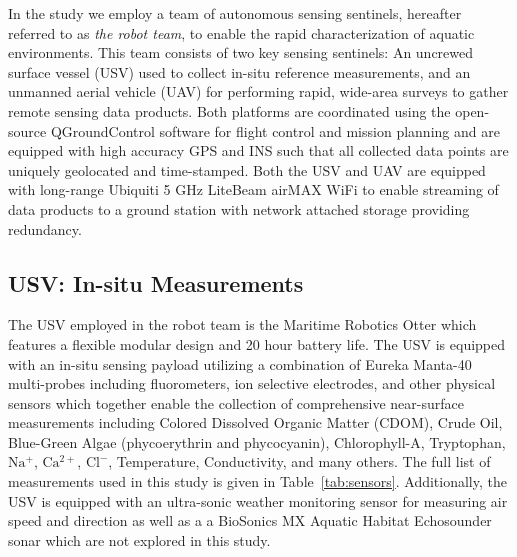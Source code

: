 \documentclass[journal,article,submit,pdftex,moreauthors]{Definitions/mdpi}
\begin{document}
In the study we employ a team of autonomous sensing sentinels, hereafter referred to as \textit{the robot team}, to enable the rapid characterization of aquatic environments. This team consists of two key sensing sentinels: An uncrewed surface vessel (USV) used to collect in-situ reference measurements, and an unmanned aerial vehicle (UAV) for performing rapid, wide-area surveys to gather remote sensing data products. Both platforms are coordinated using the open-source QGroundControl software for flight control and mission planning \cite{qgroundcontrol} and are equipped with high accuracy GPS and INS such that all collected data points are uniquely geolocated and time-stamped. Both the USV and UAV are equipped with long-range Ubiquiti 5 GHz LiteBeam airMAX WiFi to enable streaming of data products to a ground station with network attached storage providing redundancy.

\subsection{USV: In-situ Measurements}

The USV employed in the robot team is the Maritime Robotics Otter which features a flexible modular design and 20 hour battery life. The USV is equipped with an in-situ sensing payload utilizing a combination of Eureka Manta-40 multi-probes including fluorometers, ion selective electrodes, and other physical sensors which together enable the collection of comprehensive near-surface measurements including Colored Dissolved Organic Matter (CDOM), Crude Oil, Blue-Green Algae (phycoerythrin and phycocyanin), Chlorophyll-A, Tryptophan, $\mathrm{Na^+}$, $\mathrm{Ca^{2+}}$, $\mathrm{Cl^-}$, Temperature, Conductivity, and many others. The full list of measurements used in this study is given in Table~\ref{tab:sensors}. Additionally, the USV is equipped with an ultra-sonic weather monitoring sensor for measuring air speed and direction as well as a a BioSonics MX Aquatic Habitat Echosounder sonar which are not explored in this study.

\end{document}
